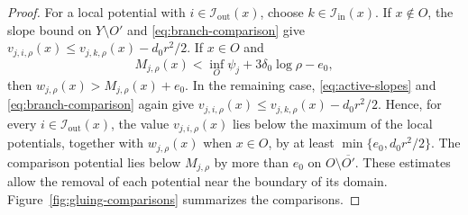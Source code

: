 \documentclass[reqno]{amsart}
\theoremstyle{remark}
\theoremstyle{plain}
\begin{document}
\begin{proof}
For a local potential with \(i\in\mathcal I_{\mathrm{out}}(x)\), choose \(k\in\mathcal I_{\mathrm{in}}(x)\). If \(x\notin O\), the slope bound on \(Y\setminus O'\) and \eqref{eq:branch-comparison} give
\(v_{j,i,\rho}(x)\le v_{j,k,\rho}(x)-d_0r^2/2\).
If \(x\in O\) and
\[
M_{j,\rho}(x)<\inf_O\psi_j+3\delta_0\log\rho-e_0,
\]
then \(w_{j,\rho}(x)>M_{j,\rho}(x)+e_0\). In the remaining case, \eqref{eq:active-slopes} and \eqref{eq:branch-comparison} again give
\(v_{j,i,\rho}(x)\le v_{j,k,\rho}(x)-d_0r^2/2\).
Hence, for every \(i\in\mathcal I_{\mathrm{out}}(x)\), the value \(v_{j,i,\rho}(x)\) lies below the maximum of the local potentials, together with \(w_{j,\rho}(x)\) when \(x\in O\), by at least \(\min\{e_0,d_0r^2/2\}\). The comparison potential lies below \(M_{j,\rho}\) by more than \(e_0\) on \(O\setminus\overline{O'}\). These estimates allow the removal of each potential near the boundary of its domain. Figure~\ref{fig:gluing-comparisons} summarizes the comparisons.



\end{proof}
\end{document}
